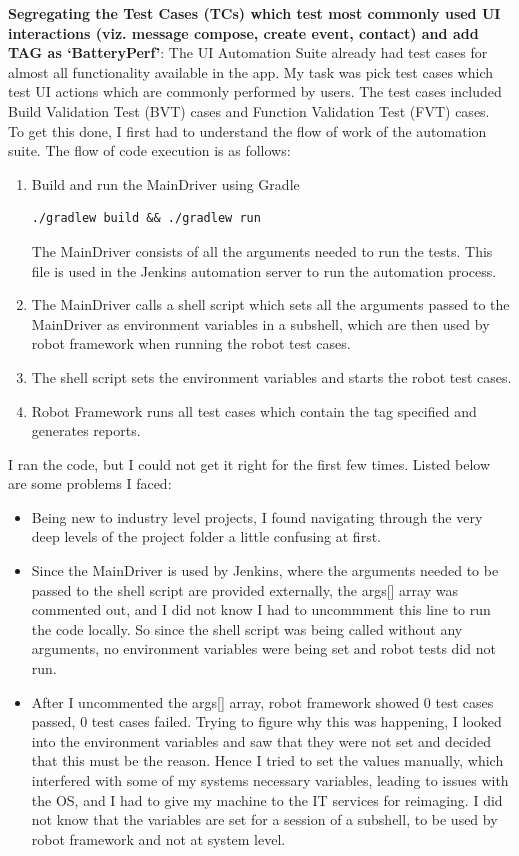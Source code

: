 \documentclass[a4paper,12pt]{article}
\begin{document}
\textbf{Segregating the Test Cases (TCs) which test most commonly used UI interactions (viz. message compose, create event, contact) and add TAG as `BatteryPerf'}: The UI Automation Suite already had test cases for almost all functionality available in the app. My task was pick test cases which test UI actions which are commonly performed by users. The test cases included Build Validation Test (BVT) cases and Function Validation Test (FVT) cases.  \\
To get this done, I first had to understand the flow of work of the automation suite. The flow of code execution is as follows: 
\begin{enumerate}
	\item Build and run the MainDriver using Gradle
	\begin{lstlisting}[style=ShellStyle]
	./gradlew build && ./gradlew run
	\end{lstlisting}
	The MainDriver consists of all the arguments needed to run the tests. This file is used in the Jenkins automation server to run the automation process.
	\item The MainDriver calls a shell script which sets all the arguments passed to the MainDriver as environment variables in a subshell, which are then used by robot framework when running the robot test cases.
	\item The shell script sets the environment variables and starts the robot test cases.
	\item Robot Framework runs all test cases which contain the tag specified and generates reports.
\end{enumerate}
I ran the code, but I could not get it right for the first few times. Listed below are some problems I faced:
\begin{itemize}
	\item Being new to industry level projects, I found navigating through the very deep levels of the project folder a little confusing at first.
	\item Since the MainDriver is used by Jenkins, where the arguments needed to be passed to the shell script are provided externally, the args[] array was commented out, and I did not know I had to uncommment this line to run the code locally. So since the shell script was being called without any arguments, no environment variables were being set and robot tests did not run.
	\item After I uncommented the args[] array, robot framework showed 0 test cases passed, 0 test cases failed. Trying to figure why this was happening, I looked into the environment variables and saw that they were not set and decided that this must be the reason. Hence I tried to set the values manually, which interfered with some of my systems necessary variables, leading to issues with the OS, and I had to give my machine to the IT services for reimaging. I did not know that the variables are set for a session of a subshell, to be used by robot framework and not at system level.
\end{itemize}
\end{document}

